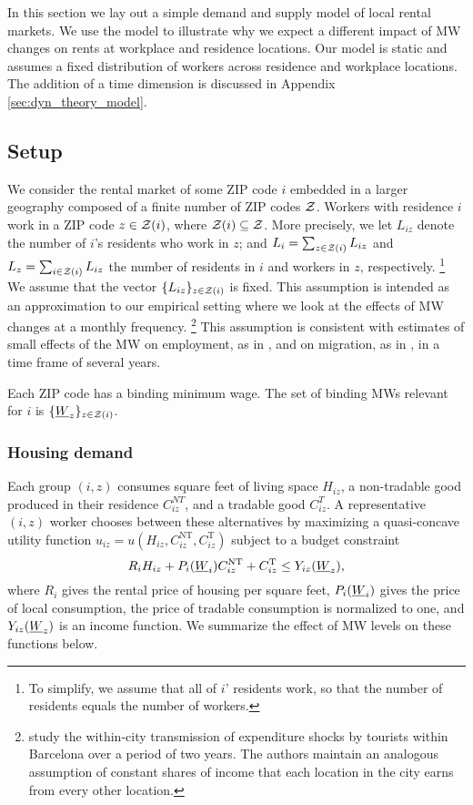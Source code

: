 
In this section we lay out a simple demand and supply model of local rental markets.
We use the model to illustrate why we expect a different impact of MW changes 
on rents at workplace and residence locations.
Our model is static and assumes a fixed distribution of workers across 
residence and workplace locations.
The addition of a time dimension is discussed in Appendix 
\ref{sec:dyn_theory_model}.

\subsection{Setup}

We consider the rental market of some ZIP code $i$ embedded in a larger geography 
composed of a finite number of ZIP codes $\mathcal{Z}$.
Workers with residence $i$ work in a ZIP code $z\in\mathcal{Z}(i)$, where 
$\mathcal{Z}(i)\subseteq\mathcal{Z}$.
More precisely, we let $L_{iz}$ denote the number of $i$'s residents who work 
in $z$; and 
$L_i = \sum_{z \in \mathcal{Z}(i)} L_{iz}$ and $L_z = \sum_{i \in \mathcal{Z}(i)} L_{iz}$ the 
number of residents in $i$ and workers in $z$, respectively.%
\footnote{To simplify, we assume that all of $i$' residents work, so that the 
number of residents equals the number of workers.}
We assume that the vector $\{L_{iz}\}_{z\in\mathcal{Z}(i)}$ is fixed.
This assumption is intended as an approximation to our empirical setting where 
we look at the effects of MW changes at a monthly frequency.%
\footnote{\textcite{AllenEtAl2020} study the within-city transmission of 
expenditure shocks by tourists within Barcelona over a period of two years.
The authors maintain an analogous assumption of constant shares of income that
each location in the city earns from every other location.}
This assumption is consistent with estimates of small effects of the MW on 
employment, as in \textcite{CegnizEtAl2019, DustmannEtAl2022}, and 
on migration, as in \textcite{PerezPerez2021}, 
in a time frame of several years.

Each ZIP code has a binding minimum wage.
The set of binding MWs relevant for $i$ is $\{\underline{W}_z\}_{z\in\mathcal{Z}(i)}$.

\subsubsection*{Housing demand}

Each group $(i,z)$ consumes
square feet of living space $H_{iz}$, 
a non-tradable good produced in their residence $C_{iz}^{NT}$, and
a tradable good $C_{iz}^T$.
A representative $(i,z)$ worker chooses between these alternatives by maximizing
a quasi-concave utility function 
$u_{iz} = u \left(H_{iz}, C^{\text{NT}}_{iz}, C^{\text{T}}_{iz}\right)$
subject to a budget constraint
$$R_i H_{iz} + P_i(\underline{W}_i) C^{\text{NT}}_{iz} + C^{\text{T}}_{iz} \leq Y_{iz}(\underline{W}_z),$$
where
$R_i$ gives the rental price of housing per square feet,
$P_i(\underline{W}_i)$ gives the price of local consumption,
the price of tradable consumption is normalized to one, and 
$Y_{iz}(\underline{W}_z)$ is an income function.
We summarize the effect of MW levels on these functions below.

